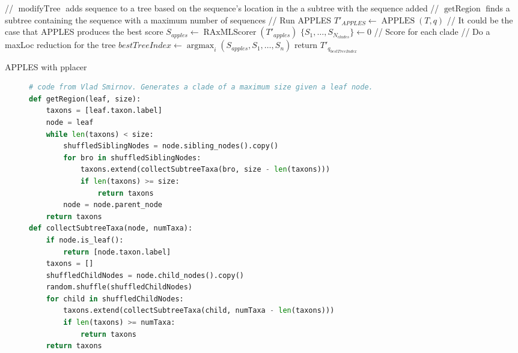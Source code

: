 \documentclass[11pt]{article}
\begin{document}
\begin{algorithm}[H]
\SetAlgoLined
{}
 // $\operatorname{modifyTree}$ adds sequence to a tree based on the sequence's location in the a subtree with the sequence added\;
 // $\operatorname{getRegion}$ finds a subtree containing the sequence with a maximum number of sequences\;
  // Run APPLES\;
  $T'_{APPLES} \leftarrow \operatorname{APPLES}(T, q)$\;
  // It could be the case that APPLES produces the best score\;
  $S_{apples} \leftarrow \operatorname{RAxMLScorer}( T'_{apples})$\;
  $\{S_1, \dots, S_{N_{clades}}\} \leftarrow 0$ // Score for each clade\;
 // Do a maxLoc reduction for the tree\;
 $bestTreeIndex \leftarrow \operatorname{argmax}_{i} (S_{apples},S_1,\dots,S_n)$\;
 return $T'_{q_{bestTreeIndex}}$\;
\caption{APPLES with pplacer}
 \label{alg:approach2}
\end{algorithm}

\begin{figure}[H]
\centering
\begin{lstlisting}[language=python]
# code from Vlad Smirnov. Generates a clade of a maximum size given a leaf node.
def getRegion(leaf, size):
    taxons = [leaf.taxon.label]
    node = leaf
    while len(taxons) < size:
        shuffledSiblingNodes = node.sibling_nodes().copy()
        for bro in shuffledSiblingNodes:
            taxons.extend(collectSubtreeTaxa(bro, size - len(taxons)))
            if len(taxons) >= size:
                return taxons
        node = node.parent_node
    return taxons
def collectSubtreeTaxa(node, numTaxa):
    if node.is_leaf():
        return [node.taxon.label]
    taxons = []
    shuffledChildNodes = node.child_nodes().copy()
    random.shuffle(shuffledChildNodes)
    for child in shuffledChildNodes:
        taxons.extend(collectSubtreeTaxa(child, numTaxa - len(taxons)))
        if len(taxons) >= numTaxa:
            return taxons
    return taxons
\end{lstlisting}
\label{alg:clade-grabber}
\end{figure}
\end{document}
